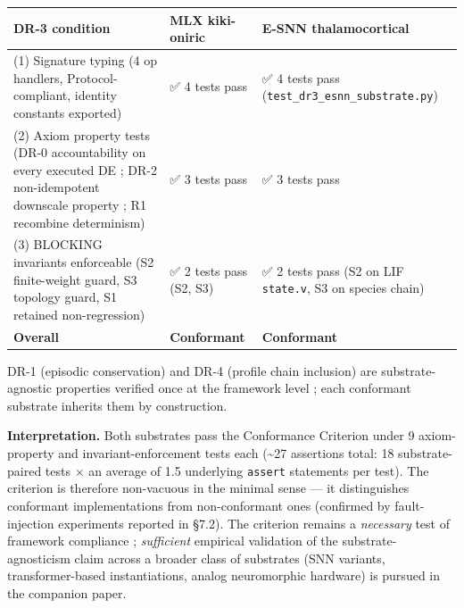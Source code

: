 \documentclass[
]{article}
\newcounter{none} %
\begin{document}
{\def\LTcaptype{none} %
\begin{longtable}[]{@{}
  >{\raggedright\arraybackslash}p{}
  >{\raggedright\arraybackslash}p{}
  >{\raggedright\arraybackslash}p{}@{}}
\toprule\noalign{}
\begin{minipage}[b]{\linewidth}\raggedright
DR-3 condition
\end{minipage} & \begin{minipage}[b]{\linewidth}\raggedright
MLX kiki-oniric
\end{minipage} & \begin{minipage}[b]{\linewidth}\raggedright
E-SNN thalamocortical
\end{minipage} \\
\midrule\noalign{}
\endhead
\bottomrule\noalign{}
\endlastfoot
(1) Signature typing (4 op handlers, Protocol-compliant, identity
constants exported) & ✅ 4 tests pass & ✅ 4 tests pass
(\texttt{test\_dr3\_esnn\_substrate.py}) \\
(2) Axiom property tests (DR-0 accountability on every executed DE ;
DR-2 non-idempotent downscale property ; R1 recombine determinism) & ✅
3 tests pass & ✅ 3 tests pass \\
(3) BLOCKING invariants enforceable (S2 finite-weight guard, S3 topology
guard, S1 retained non-regression) & ✅ 2 tests pass (S2, S3) & ✅ 2
tests pass (S2 on LIF \texttt{state.v}, S3 on species chain) \\
\textbf{Overall} & \textbf{Conformant} & \textbf{Conformant} \\
\end{longtable}
}

DR-1 (episodic conservation) and DR-4 (profile chain inclusion) are
substrate-agnostic properties verified once at the framework level ;
each conformant substrate inherits them by construction.

\textbf{Interpretation.} Both substrates pass the Conformance Criterion
under 9 axiom-property and invariant-enforcement tests each
(\textasciitilde27 assertions total: 18 substrate-paired tests × an
average of 1.5 underlying \texttt{assert} statements per test). The
criterion is therefore non-vacuous in the minimal sense --- it
distinguishes conformant implementations from non-conformant ones
(confirmed by fault-injection experiments reported in §7.2). The
criterion remains a \emph{necessary} test of framework compliance ;
\emph{sufficient} empirical validation of the substrate-agnosticism
claim across a broader class of substrates (SNN variants,
transformer-based instantiations, analog neuromorphic hardware) is
pursued in the companion paper.
\end{document}
